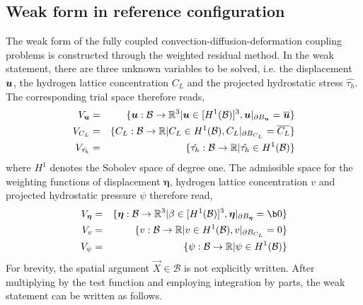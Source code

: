 \documentclass[10pt]{elsarticle}
\newcommand{\mbs}[1]{\boldsymbol{#1}}
\def\beeta{{\mbs{\eta}}}
\begin{document}
\subsection{Weak form in reference configuration}
The weak form of the fully coupled convection-diffusion-deformation coupling problems is constructed
through the weighted residual method. In the weak statement, there are three unknown variables to be solved, i.e. 
the displacement $\bu$, the hydrogen lattice concentration $C_{L}$  and the projected hydrostatic stress $\hat{\tau_{h}}$. 
The corresponding trial space therefore reads, 
\begin{eqnarray}
    \label{eq:trialSpace}
      V_{\bu} &=& \{ \bu : \mathcal{B} \rightarrow \mathbb{R}^{3} | \bu \in [H^{1}(\mathcal{B})]^{3} , \label{eq:uspace} \bu|_{\partial B_{\bu}} = \overline{\bu} \} \nonumber \\
       V_{C_{L}} &=& \{ C_{L} : \mathcal{B} \rightarrow \mathbb{R} | C_{L} \in H^{1}(\mathcal{B}), C_{L}|_{\partial B_{C_{L}}} = \overline{C_{L}} \} \\
      V_{\hat{\tau_{h}}} &=& \{  \hat{\tau_{h}} : \mathcal{B} \rightarrow \mathbb{R} | \hat{\tau_{h}} \in H^{1}(\mathcal{B}) \} \nonumber 
    \end{eqnarray}
    where $H^{1}$ denotes the Sobolev space of degree one.  The
    admissible space for the weighting functions of displacement $\beeta$, hydrogen lattice concentration $v$ and projected hydrostatic pressure $\psi$ therefore read,
    \begin{eqnarray}
    \label{eq:variation}
      V_{\beeta} &=& \{  \beeta : \mathcal{B} \rightarrow \mathbb{R}^{3} | \beta \in [H^{1}(\mathcal{B})]^{3} ,  \beeta|_{\partial B_{\beeta}} = \b0 \} \nonumber \\
      V_{v} &=& \{ v : \mathcal{B} \rightarrow \mathbb{R} | v \in H^{1}(\mathcal{B}), v|_{\partial B_{C_{L}}} =0 \}  \\
      V_{\psi} &=& \{ \psi : \mathcal{B} \rightarrow \mathbb{R} | \psi \in H^{1}(\mathcal{B}) \}
      \nonumber 
      \label{eq:varp}
    \end{eqnarray}
    For brevity, the spatial argument $\vec{X} \in \mathcal{B}$ is not
    explicitly written. After multiplying by the test function and employing integration by parts, the weak statement can be written as follows. 
    
\end{document}
